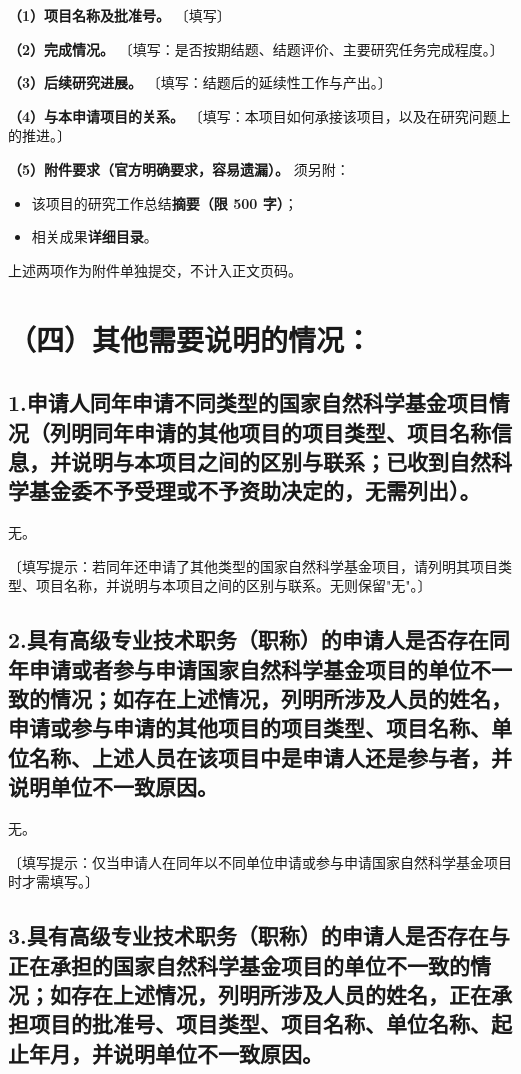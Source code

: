 \documentclass[12pt,a4paper]{ctexart}
\begin{document}
\textbf{（1）项目名称及批准号。} 〔填写〕

\textbf{（2）完成情况。} 〔填写：是否按期结题、结题评价、主要研究任务完成程度。〕

\textbf{（3）后续研究进展。} 〔填写：结题后的延续性工作与产出。〕

\textbf{（4）与本申请项目的关系。} 〔填写：本项目如何承接该项目，以及在研究问题上的推进。〕

\textbf{（5）附件要求（官方明确要求，容易遗漏）。} 须另附：

\begin{itemize}[leftmargin=2em,itemsep=2pt,topsep=3pt]
  \item 该项目的研究工作总结\textbf{摘要（限 500 字）}；
  \item 相关成果\textbf{详细目录}。
\end{itemize}

上述两项作为附件单独提交，不计入正文页码。

\section*{（四）其他需要说明的情况：}

\subsection*{1.申请人同年申请不同类型的国家自然科学基金项目情况（列明同年申请的其他项目的项目类型、项目名称信息，并说明与本项目之间的区别与联系；已收到自然科学基金委不予受理或不予资助决定的，无需列出）。}

无。

〔填写提示：若同年还申请了其他类型的国家自然科学基金项目，请列明其项目类型、项目名称，并说明与本项目之间的区别与联系。无则保留"无"。〕

\subsection*{2.具有高级专业技术职务（职称）的申请人是否存在同年申请或者参与申请国家自然科学基金项目的单位不一致的情况；如存在上述情况，列明所涉及人员的姓名，申请或参与申请的其他项目的项目类型、项目名称、单位名称、上述人员在该项目中是申请人还是参与者，并说明单位不一致原因。}

无。

〔填写提示：仅当申请人在同年以不同单位申请或参与申请国家自然科学基金项目时才需填写。〕

\subsection*{3.具有高级专业技术职务（职称）的申请人是否存在与正在承担的国家自然科学基金项目的单位不一致的情况；如存在上述情况，列明所涉及人员的姓名，正在承担项目的批准号、项目类型、项目名称、单位名称、起止年月，并说明单位不一致原因。}
\end{document}
